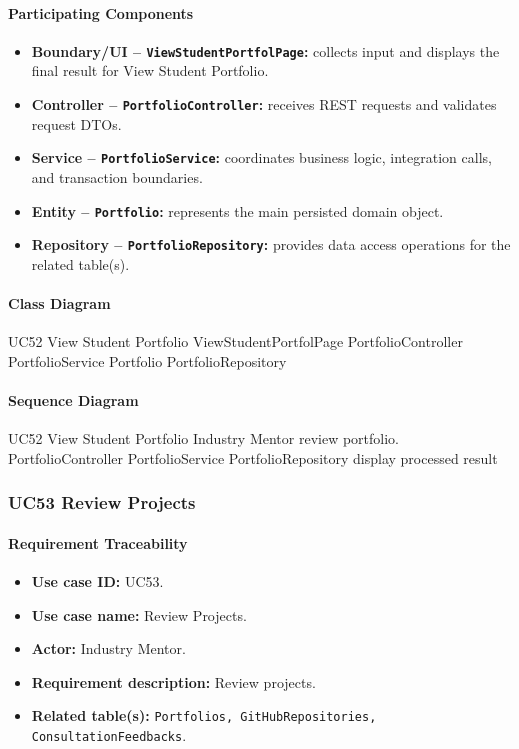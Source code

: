 \paragraph{Participating Components}

\begin{itemize}
    \item \textbf{Boundary/UI -- \texttt{ViewStudentPortfolPage}:} collects input and displays the final result for View Student Portfolio.
    \item \textbf{Controller -- \texttt{PortfolioController}:} receives REST requests and validates request DTOs.
    \item \textbf{Service -- \texttt{PortfolioService}:} coordinates business logic, integration calls, and transaction boundaries.
    \item \textbf{Entity -- \texttt{Portfolio}:} represents the main persisted domain object.
    \item \textbf{Repository -- \texttt{PortfolioRepository}:} provides data access operations for the related table(s).
\end{itemize}

\paragraph{Class Diagram}

\ClassDiagram
{UC52 View Student Portfolio}
{ViewStudentPortfolPage}
{PortfolioController}
{PortfolioService}
{Portfolio}
{PortfolioRepository}

\paragraph{Sequence Diagram}

\SequenceDiagram
{UC52 View Student Portfolio}
{Industry Mentor}
{review portfolio.}
{PortfolioController}
{PortfolioService}
{PortfolioRepository}
{display processed result}

\subsubsection{UC53 Review Projects}

\paragraph{Requirement Traceability}

\begin{itemize}
    \item \textbf{Use case ID:} UC53.
    \item \textbf{Use case name:} Review Projects.
    \item \textbf{Actor:} Industry Mentor.
    \item \textbf{Requirement description:} Review projects.
    \item \textbf{Related table(s):} \texttt{Portfolios, GitHubRepositories, ConsultationFeedbacks}.
\end{itemize}

